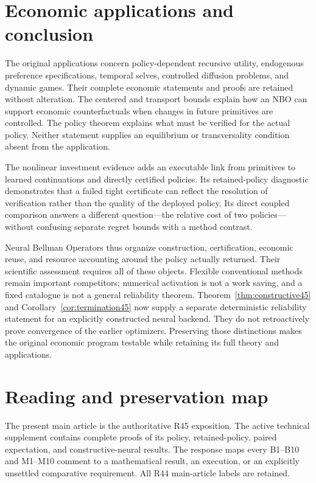 \documentclass[ecta,nameyear,draft]{econsocart}
\begin{document}


\section{Economic applications and conclusion}\label{sec:conclusion}
The original applications concern policy-dependent recursive utility, endogenous preference specifications, temporal selves, controlled diffusion problems, and dynamic games. Their complete economic statements and proofs are retained without alteration. The centered and transport bounds explain how an NBO can support economic counterfactuals when changes in future primitives are controlled. The policy theorem explains what must be verified for the actual policy. Neither statement supplies an equilibrium or transversality condition absent from the application.

The nonlinear investment evidence adds an executable link from primitives to learned continuations and directly certified policies. Its retained-policy diagnostic demonstrates that a failed tight certificate can reflect the resolution of verification rather than the quality of the deployed policy. Its direct coupled comparison answers a different question---the relative cost of two policies---without confusing separate regret bounds with a method contrast.

Neural Bellman Operators thus organize construction, certification, economic reuse, and resource accounting around the policy actually returned. Their scientific assessment requires all of these objects. Flexible conventional methods remain important competitors; numerical activation is not a work saving, and a fixed catalogue is not a general reliability theorem. Theorem~\ref{thm:constructive45} and Corollary~\ref{cor:termination45} now supply a separate deterministic reliability statement for an explicitly constructed neural backend. They do not retroactively prove convergence of the earlier optimizers. Preserving those distinctions makes the original economic program testable while retaining its full theory and applications.

\appendix
\section{Reading and preservation map}\label{app:map}
The present main article is the authoritative R45 exposition. The active technical supplement contains complete proofs of its policy, retained-policy, paired expectation, and constructive-neural results. The response maps every B1--B10 and M1--M10 comment to a mathematical result, an execution, or an explicitly unsettled comparative requirement. All R44 main-article labels are retained.
\end{document}
